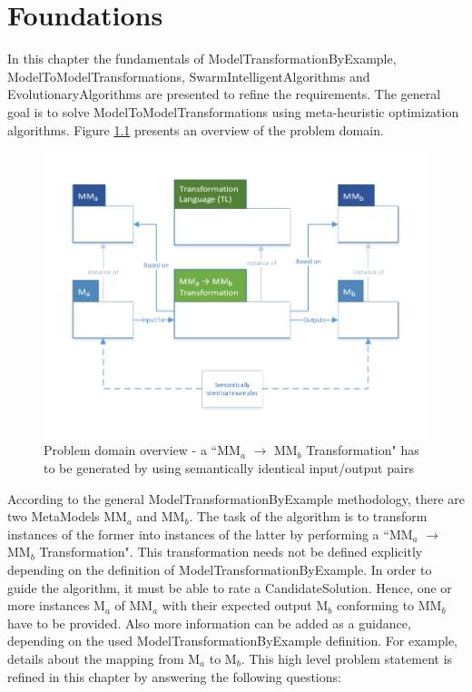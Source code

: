\chapter{Foundations}\label{chapFoundations}

In this chapter the fundamentals of \gls{ModelTransformationByExample}, \glspl{ModelToModelTransformation}, \glspl{SwarmIntelligentAlgorithm} and \glspl{EvolutionaryAlgorithm} are presented to refine the requirements. The general goal is to solve \glspl{ModelToModelTransformation} using meta-heuristic optimization algorithms. Figure \ref{figProblemDomainOverview} presents an overview of the problem domain. 

\begin{figure}[htb]
	\centering
	\includegraphics[scale=0.8, trim=0cm 1cm 0cm 1cm, clip=true]{Images/ProblemDomainOverview.pdf} 
	\caption{Problem domain overview - a ``MM$_a$ $\rightarrow$ MM$_b$ Transformation" has to be generated by using semantically identical input/output pairs}
	\label{figProblemDomainOverview}
\end{figure}

According to the general \gls{ModelTransformationByExample} methodology, there are two \glspl{MetaModel} MM$_a$ and MM$_b$. The task of the algorithm is to transform instances of the former into instances of the latter by performing a ``MM$_a$ $\rightarrow$ MM$_b$ Transformation". This transformation needs not be defined explicitly depending on the definition of \gls{ModelTransformationByExample}. In order to guide the algorithm, it must be able to rate a \gls{CandidateSolution}. Hence, one or more instances M$_a$ of MM$_a$ with their expected output M$_b$ conforming to MM$_b$ have to be provided. Also more information can be added as a guidance, depending on the used \gls{ModelTransformationByExample} definition. For example, details about the mapping from M$_a$ to M$_b$. This high level problem statement is refined in this chapter by answering the following questions:


